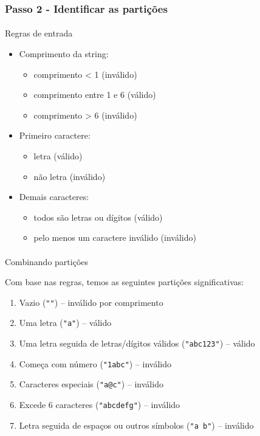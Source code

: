 \documentclass[
  letterpaper,
  DIV=11,
  numbers=noendperiod]{scrartcl}
\makeatletter
\let\oldparagraph\paragraph
\renewcommand{\paragraph}{
    \@ifstar
      \xxxParagraphStar
      \xxxParagraphNoStar
  }
\newcommand{\xxxParagraphStar}[1]{\oldparagraph*{#1}\mbox{}}
\newcommand{\xxxParagraphNoStar}[1]{\oldparagraph{#1}\mbox{}}
\providecommand{\tightlist}{%
  \setlength{\itemsep}{0pt}\setlength{\parskip}{0pt}}
\makeatother
\begin{document}
\subsubsection{Passo 2 - Identificar as
partições}\label{passo-2---identificar-as-partiuxe7uxf5es}

\paragraph{Regras de entrada}\label{regras-de-entrada}

\begin{itemize}
\tightlist
\item
  Comprimento da string:

  \begin{itemize}
  \tightlist
  \item
    comprimento \textless{} 1 (inválido)
  \item
    comprimento entre 1 e 6 (válido)
  \item
    comprimento \textgreater{} 6 (inválido)
  \end{itemize}
\item
  Primeiro caractere:

  \begin{itemize}
  \tightlist
  \item
    letra (válido)
  \item
    não letra (inválido)
  \end{itemize}
\item
  Demais caracteres:

  \begin{itemize}
  \tightlist
  \item
    todos são letras ou dígitos (válido)
  \item
    pelo menos um caractere inválido (inválido)
  \end{itemize}
\end{itemize}

\paragraph{Combinando partições}\label{combinando-partiuxe7uxf5es}

Com base nas regras, temos as seguintes partições significativas:

\begin{enumerate}
\def\labelenumi{\arabic{enumi}.}
\tightlist
\item
  Vazio (\texttt{""}) -- inválido por comprimento
\item
  Uma letra (\texttt{"a"}) -- válido
\item
  Uma letra seguida de letras/dígitos válidos (\texttt{"abc123"}) --
  válido
\item
  Começa com número (\texttt{"1abc"}) -- inválido
\item
  Caracteres especiais (\texttt{"a@c"}) -- inválido
\item
  Excede 6 caracteres (\texttt{"abcdefg"}) -- inválido
\item
  Letra seguida de espaços ou outros símbolos (\texttt{"a\ b"}) --
  inválido
\end{enumerate}
\end{document}
